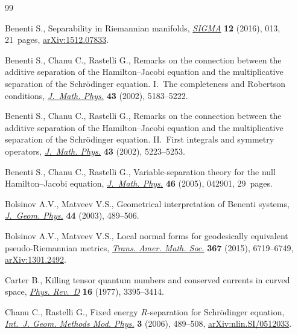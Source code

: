 \documentclass[pdftex]{sigma}
\numberwithin{equation}{section}
\begin{document}
\begin{thebibliography}{99}
\footnotesize\itemsep=0pt

Benenti S., Separability in {R}iemannian manifolds, \href{https://doi.org/10.3842/SIGMA.2016.013}{\textit{SIGMA}} \textbf{12}
 (2016), 013, 21~pages, \href{https://arxiv.org/abs/1512.07833}{arXiv:1512.07833}.

Benenti S., Chanu C., Rastelli G., Remarks on the connection between the
 additive separation of the {H}amilton--{J}acobi equation and the
 multiplicative separation of the {S}chr\"{o}dinger equation. {I}.~{T}he
 completeness and {R}obertson conditions, \href{https://doi.org/10.1063/1.1506180}{\textit{J.~Math. Phys.}} \textbf{43}
 (2002), 5183--5222.

Benenti S., Chanu C., Rastelli G., Remarks on the connection between the
 additive separation of the {H}amilton--{J}acobi equation and the
 multiplicative separation of the {S}chr\"{o}dinger equation. {II}.~{F}irst
 integrals and symmetry operators, \href{https://doi.org/10.1063/1.1506181}{\textit{J.~Math. Phys.}} \textbf{43} (2002),
 5223--5253.

Benenti S., Chanu C., Rastelli G., Variable-separation theory for the null
 {H}amilton--{J}acobi equation, \href{https://doi.org/10.1063/1.1862325}{\textit{J.~Math. Phys.}} \textbf{46} (2005),
 042901, 29~pages.

Bolsinov A.V., Matveev V.S., Geometrical interpretation of {B}enenti systems,
 \href{https://doi.org/10.1016/S0393-0440(02)00054-2}{\textit{J.~Geom. Phys.}} \textbf{44} (2003), 489--506.

Bolsinov A.V., Matveev V.S., Local normal forms for geodesically equivalent
 pseudo-{R}iemannian metrics, \href{https://doi.org/10.1090/S0002-9947-2014-06416-7}{\textit{Trans. Amer. Math. Soc.}} \textbf{367}
 (2015), 6719--6749, \href{https://arxiv.org/abs/1301.2492}{arXiv:1301.2492}.

Carter B., Killing tensor quantum numbers and conserved currents in curved
 space, \href{https://doi.org/10.1103/PhysRevD.16.3395}{\textit{Phys. Rev.~D}} \textbf{16} (1977), 3395--3414.

Chanu C., Rastelli G., Fixed energy {$R$}-separation for {S}chr\"{o}dinger
 equation, \href{https://doi.org/10.1142/S021988780600120X}{\textit{Int.~J. Geom. Methods Mod. Phys.}} \textbf{3} (2006),
 489--508, \href{https://arxiv.org/abs/nlin.SI/0512033}{arXiv:nlin.SI/0512033}.


\end{thebibliography}
\end{document}

